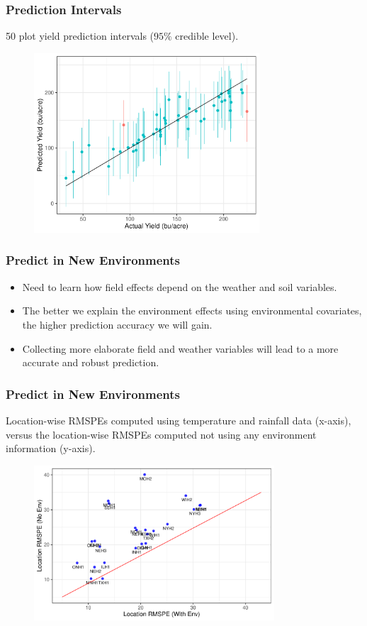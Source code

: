 \documentclass{beamer}
\begin{document}
\begin{frame}
	\frametitle{Prediction Intervals}
	50 plot yield prediction intervals ($95\%$ credible level).
	\begin{figure}[H]
		\centering
		\includegraphics[width = 0.75\textwidth]{true_vs_predint.pdf}
	\end{figure}
\end{frame}


\begin{frame}
	\frametitle{Predict in New Environments}
	
	\begin{itemize}
	\item Need to learn how field effects depend on the weather and soil variables.
	\item The better we explain the environment effects using environmental covariates, the higher prediction accuracy we will gain.
	\item Collecting more elaborate field and weather variables will lead to a more accurate and robust prediction.
	\end{itemize}
	
\end{frame}



\begin{frame}
	\frametitle{Predict in New Environments}
	Location-wise RMSPEs computed using temperature and rainfall data (x-axis), versus the location-wise RMSPEs computed not using any environment information (y-axis). 
	\begin{figure}[H]
		\centering
		\includegraphics[width = 0.8\textwidth]{type3pred1.pdf}
	\end{figure}
	
\end{frame}
\end{document}
